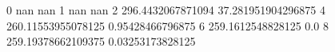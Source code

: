 0 nan nan
1 nan nan
2 296.4432067871094 37.281951904296875
4 260.11553955078125 0.95428466796875
6 259.1612548828125 0.0
8 259.19378662109375 0.03253173828125
